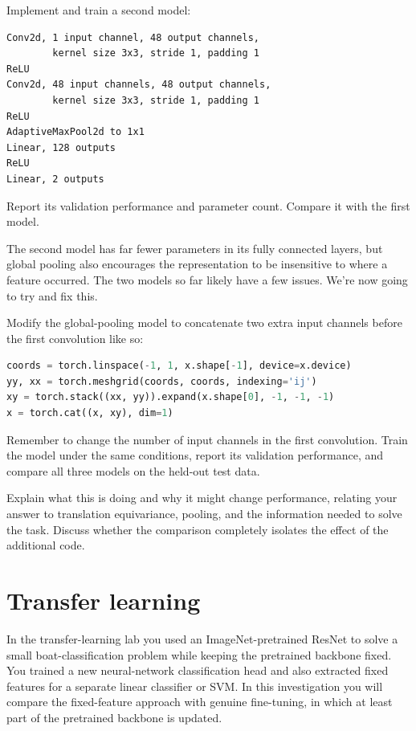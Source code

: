 \documentclass[a4paper]{article}
\begin{document}
\begin{tcolorbox}[title=1.2 Introduce global pooling (1 mark)]
Implement and train a second model:
\begin{lstlisting}
Conv2d, 1 input channel, 48 output channels,
        kernel size 3x3, stride 1, padding 1
ReLU
Conv2d, 48 input channels, 48 output channels,
        kernel size 3x3, stride 1, padding 1
ReLU
AdaptiveMaxPool2d to 1x1
Linear, 128 outputs
ReLU
Linear, 2 outputs
\end{lstlisting}
Report its validation performance and parameter count. Compare it with the first model.
\end{tcolorbox}

The second model has far fewer parameters in its fully connected layers, but global pooling also encourages the representation to be insensitive to where a feature occurred. The two models so far likely have a few issues. We’re now going to try and fix this.

\begin{tcolorbox}[parbox=false,title=1.3 Let's regress (3 marks)]
Modify the global-pooling model to concatenate two extra input channels before the first convolution like so:
\begin{lstlisting}[language=Python]
coords = torch.linspace(-1, 1, x.shape[-1], device=x.device)
yy, xx = torch.meshgrid(coords, coords, indexing='ij')
xy = torch.stack((xx, yy)).expand(x.shape[0], -1, -1, -1)
x = torch.cat((x, xy), dim=1)
\end{lstlisting}

Remember to change the number of input channels in the first convolution. Train the model under the same conditions, report its validation performance, and compare all three models on the held-out test data.

Explain what this is doing and why it might change performance, relating your answer to translation equivariance, pooling, and the information needed to solve the task. Discuss whether the comparison completely isolates the effect of the additional code.
\end{tcolorbox}

\section{Transfer learning}

In the transfer-learning lab you used an ImageNet-pretrained ResNet to solve a small boat-classification problem while keeping the pretrained backbone fixed. You trained a new neural-network classification head and also extracted fixed features for a separate linear classifier or SVM. In this investigation you will compare the fixed-feature approach with genuine fine-tuning, in which at least part of the pretrained backbone is updated.
\end{document}
